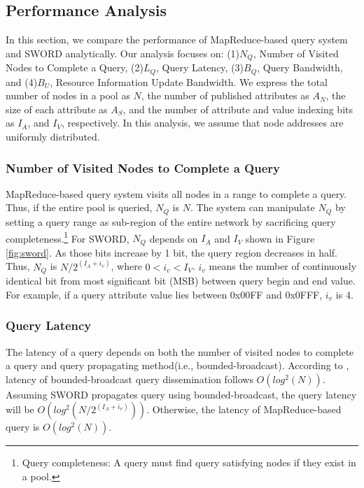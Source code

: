 \documentclass{acm_proc_article-sp}
\begin{document}
\subsection{Performance Analysis}
In this section, we compare the performance of MapReduce-based query system and SWORD analytically. 
Our analysis focuses on:  (1)$N_Q$, Number of Visited Nodes to Complete a Query, (2)$L_Q$, Query Latency, (3)$B_Q$, Query Bandwidth, and (4)$B_U$, Resource Information Update Bandwidth.
We express the total number of nodes in a pool as $N$, the number of published attributes as $A_N$, the size of each attribute as $A_S$, 
and the number of attribute and value indexing bits as $I_A$, and $I_V$, respectively. In this analysis, we assume that node addresses are uniformly distributed.

\subsubsection{Number of Visited Nodes to Complete a Query}
MapReduce-based query system visits all nodes in a range to complete a query. Thus, if the entire pool is queried, $N_Q$ is $N$. 
The system can manipulate $N_Q$ by setting a query range as sub-region of the entire network by sacrificing query completeness.\footnote{Query completeness: A query must find query satisfying nodes if they exist in a pool.}
For SWORD, $N_Q$ depends on $I_A$ and $I_V$ shown in Figure \ref{fig:sword}. As those bits increase by 1 bit, 
the query region decreases in half. Thus, $N_Q$ is \begin{math}N/2^{(I_A+i_v)}\end{math}, where \begin{math}0<i_v<I_V\end{math}.
\begin{math}i_v\end{math} means the number of continuously identical bit from most significant bit (MSB) between query begin and end value. 
For example, if a query attribute value lies between 0x00FF and 0x0FFF, \begin{math}i_v\end{math} is 4. 
\subsubsection{Query Latency}
The latency of a query depends on both the number of visited nodes to complete a query and query propagating method(i.e., bounded-broadcast). 
According to \cite{deetoo}, latency of bounded-broadcast query dissemination follows \begin{math}O(log^2(N))\end{math}. Assuming SWORD propagates query using bounded-broadcast,
the query latency will be \begin{math}O(log^2(N/2^{(I_A+i_v)}))\end{math}. Otherwise, the latency of MapReduce-based query is \begin{math}O(log^2(N))\end{math}.
\end{document}
